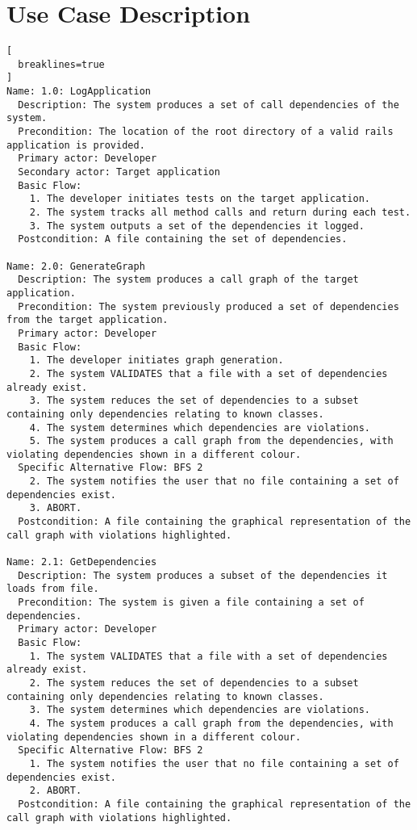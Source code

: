 \section{Use Case Description}
\label{sec:descrip}
\begin{lstlisting}[
  breaklines=true
]
Name: 1.0: LogApplication 
  Description: The system produces a set of call dependencies of the system.
  Precondition: The location of the root directory of a valid rails application is provided.
  Primary actor: Developer
  Secondary actor: Target application
  Basic Flow:
    1. The developer initiates tests on the target application.
    2. The system tracks all method calls and return during each test.
    3. The system outputs a set of the dependencies it logged.
  Postcondition: A file containing the set of dependencies.

Name: 2.0: GenerateGraph
  Description: The system produces a call graph of the target application.
  Precondition: The system previously produced a set of dependencies from the target application.
  Primary actor: Developer
  Basic Flow:
    1. The developer initiates graph generation.
    2. The system VALIDATES that a file with a set of dependencies already exist.
    3. The system reduces the set of dependencies to a subset containing only dependencies relating to known classes.
    4. The system determines which dependencies are violations.
    5. The system produces a call graph from the dependencies, with violating dependencies shown in a different colour.
  Specific Alternative Flow: BFS 2
    2. The system notifies the user that no file containing a set of dependencies exist.
    3. ABORT.
  Postcondition: A file containing the graphical representation of the call graph with violations highlighted.

Name: 2.1: GetDependencies
  Description: The system produces a subset of the dependencies it loads from file.
  Precondition: The system is given a file containing a set of dependencies.
  Primary actor: Developer
  Basic Flow:
    1. The system VALIDATES that a file with a set of dependencies already exist.
    2. The system reduces the set of dependencies to a subset containing only dependencies relating to known classes.
    3. The system determines which dependencies are violations.
    4. The system produces a call graph from the dependencies, with violating dependencies shown in a different colour.
  Specific Alternative Flow: BFS 2
    1. The system notifies the user that no file containing a set of dependencies exist.
    2. ABORT.
  Postcondition: A file containing the graphical representation of the call graph with violations highlighted.


\end{lstlisting}
